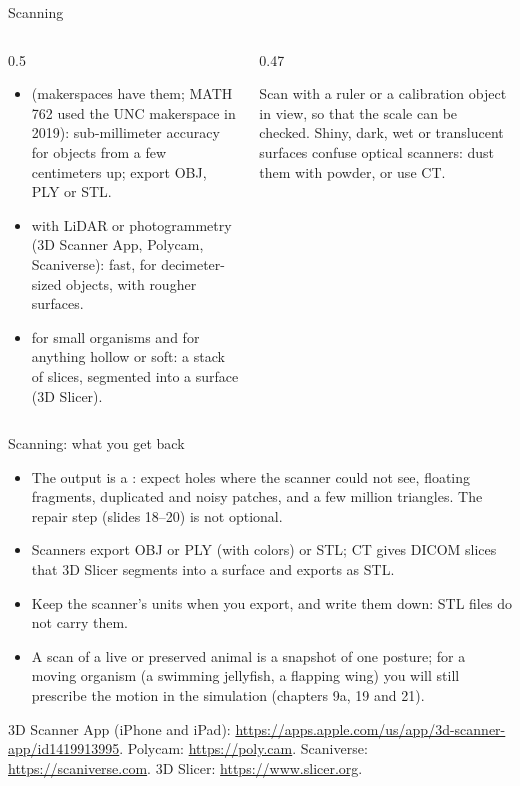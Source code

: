 \documentclass[aspectratio=169,11pt]{beamer}
\begin{document}
\begin{frame}{Scanning}
\begin{columns}[T,onlytextwidth]
\begin{column}{0.5\textwidth}
\begin{itemize}
  \item {} (makerspaces have them; MATH 762 used the UNC makerspace in 2019): sub-millimeter accuracy for objects from a few centimeters up; export OBJ, PLY or STL.
  \item {} with LiDAR or photogrammetry (3D Scanner App, Polycam, Scaniverse): fast, for decimeter-sized objects, with rougher surfaces.
  \item {} for small organisms and for anything hollow or soft: a stack of slices, segmented into a surface (3D Slicer).
\end{itemize}
\end{column}
\begin{column}{0.47\textwidth}
\begin{punchbox}
\small Scan with a ruler or a calibration object in view, so that the scale can be checked. Shiny, dark, wet or translucent surfaces confuse optical scanners: dust them with powder, or use CT.
\end{punchbox}
\end{column}
\end{columns}
\end{frame}

\begin{frame}{Scanning: what you get back}
\begin{itemize}
  \item The output is a : expect holes where the scanner could not see, floating fragments, duplicated and noisy patches, and a few million triangles. The repair step (slides 18--20) is not optional.
  \item Scanners export OBJ or PLY (with colors) or STL; CT gives DICOM slices that 3D Slicer segments into a surface and exports as STL.
  \item Keep the scanner's units when you export, and write them down: STL files do not carry them.
  \item A scan of a live or preserved animal is a snapshot of one posture; for a moving organism (a swimming jellyfish, a flapping wing) you will still prescribe the motion in the simulation (chapters 9a, 19 and 21).
\end{itemize}
\vspace{2mm}
\small 3D Scanner App (iPhone and iPad): \url{https://apps.apple.com/us/app/3d-scanner-app/id1419913995}. Polycam: \url{https://poly.cam}. Scaniverse: \url{https://scaniverse.com}. 3D Slicer: \url{https://www.slicer.org}.
\end{frame}
\end{document}
